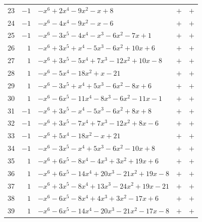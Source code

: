 \documentclass[11pt]{article}
\begin{document}
\begin{longtable}{@{}rrlcc@{}}
23 & $-1$ & $-x^{6}+2x^{4}-9x^{2}-x+8$ & $+$ & $+$\\
24 & $-1$ & $-x^{6}-4x^{4}-9x^{2}-x-6$ & $+$ & $+$\\
25 & $-1$ & $-x^{6}-3x^{5}-4x^{4}-x^{3}-6x^{2}-7x+1$ & $+$ & $+$\\
26 & $1$ & $-x^{6}+3x^{5}+x^{4}-5x^{3}-6x^{2}+10x+6$ & $+$ & $+$\\
27 & $1$ & $-x^{6}+3x^{5}-5x^{4}+7x^{3}-12x^{2}+10x-8$ & $+$ & $+$\\
28 & $1$ & $-x^{6}-5x^{4}-18x^{2}+x-21$ & $+$ & $+$\\
29 & $1$ & $-x^{6}-3x^{5}+x^{4}+5x^{3}-6x^{2}-8x+6$ & $+$ & $+$\\
30 & $1$ & $-x^{6}-6x^{5}-11x^{4}-8x^{3}-6x^{2}-11x-1$ & $+$ & $+$\\
31 & $-1$ & $-x^{6}+3x^{5}-x^{4}-5x^{3}-6x^{2}+8x+8$ & $+$ & $+$\\
32 & $-1$ & $-x^{6}+3x^{5}-7x^{4}+7x^{3}-12x^{2}+8x-6$ & $+$ & $+$\\
33 & $-1$ & $-x^{6}+5x^{4}-18x^{2}-x+21$ & $+$ & $+$\\
34 & $-1$ & $-x^{6}-3x^{5}-x^{4}+5x^{3}-6x^{2}-10x+8$ & $+$ & $+$\\
35 & $1$ & $-x^{6}+6x^{5}-8x^{4}-4x^{3}+3x^{2}+19x+6$ & $+$ & $+$\\
36 & $1$ & $-x^{6}+6x^{5}-14x^{4}+20x^{3}-21x^{2}+19x-8$ & $+$ & $+$\\
37 & $1$ & $-x^{6}+3x^{5}-8x^{4}+13x^{3}-24x^{2}+19x-21$ & $+$ & $+$\\
38 & $1$ & $-x^{6}-6x^{5}-8x^{4}+4x^{3}+3x^{2}-17x+6$ & $+$ & $+$\\
39 & $1$ & $-x^{6}-6x^{5}-14x^{4}-20x^{3}-21x^{2}-17x-8$ & $+$ & $+$\\
\end{longtable}
\endgroup
\end{document}
